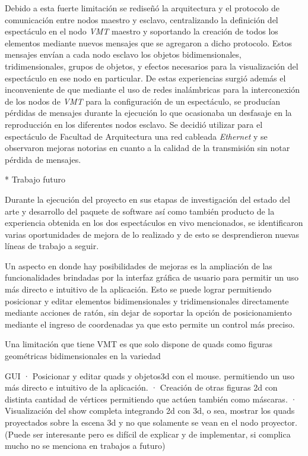 Debido a esta fuerte limitación se rediseñó la arquitectura y el protocolo de comunicación entre nodos maestro y esclavo, centralizando la definición del espectáculo en el nodo \emph{VMT} maestro y soportando la creación de todos los elementos mediante nuevos mensajes que se agregaron a dicho protocolo. Estos mensajes envían a cada nodo esclavo los objetos bidimensionales, tridimensionales, grupos de objetos, y efectos necesarios para la visualización del espectáculo en ese nodo en particular.
De estas experiencias surgió además el inconveniente de que mediante el uso de redes inalámbricas para la interconexión de los nodos de \emph{VMT} para la configuración de un espectáculo, se producían pérdidas de mensajes durante la ejecución lo que ocasionaba un desfasaje en la reproducción en los diferentes nodos esclavo. Se decidió utilizar para el espectáculo de Facultad de Arquitectura una red cableada \emph{Ethernet} y se observaron mejoras notorias en cuanto a la calidad de la transmisión sin notar pérdida de mensajes.

* Trabajo futuro

Durante la ejecución del proyecto en sus etapas de investigación del estado del arte y desarrollo del paquete de software así como también producto de la experiencia obtenida en los dos espectáculos en vivo mencionados, se identificaron varias oportunidades de mejora de lo realizado y de esto se desprendieron nuevas líneas de trabajo a seguir.

Un aspecto en donde hay posibilidades de mejoras es la ampliación de las funcionalidades brindadas por la interfaz gráfica de usuario para permitir un uso más directo e intuitivo de la aplicación.
Esto se puede lograr permitiendo posicionar y editar elementos bidimensionales y tridimensionales directamente mediante acciones de ratón, sin dejar de soportar la opción de posicionamiento mediante el ingreso de coordenadas ya que esto permite un control más preciso.

Una limitación que tiene VMT es que solo dispone de quads como figuras geométricas bidimensionales en la variedad 

GUI
· Posicionar y editar quads y objetos3d con el mouse. permitiendo un uso más directo e intuitivo de la aplicación.
· Creación de otras figuras 2d con distinta cantidad de vértices permitiendo que actúen también como máscaras.
· Visualización del show completa integrando 2d con 3d, o sea, mostrar los quads proyectados sobre la escena 3d y no que solamente se vean en el nodo proyector. (Puede ser interesante pero es difícil de explicar y de implementar, si complica mucho no se menciona en trabajos a futuro)

